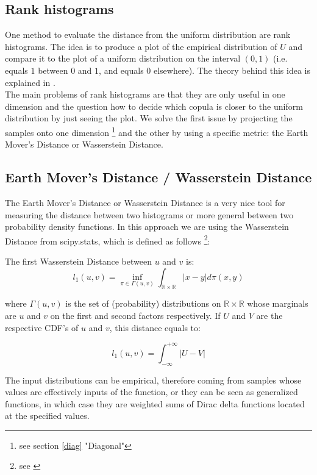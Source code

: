 \subsection{Rank histograms}\label{rank}

One method to evaluate the distance from the uniform distribution are rank histograms. The idea is to produce a plot of the empirical distribution of $U$ and compare it to the plot of a uniform distribution on the interval $(0,1)$ (i.e. equals $1$ between $0$ and $1$, and equals $0$ elsewhere). The theory behind this idea is explained in \cite{rank histo}.\\

The main problems of rank histograms are that they are only useful in one dimension and the question how to decide which copula is closer to the uniform distribution by just seeing the plot. We solve the first issue by projecting the samples onto one dimension \footnote{see section \ref{diag} "Diagonal"} and the other by using a specific metric: the Earth Mover's Distance or Wasserstein Distance.  

\subsection{Earth Mover's Distance / Wasserstein Distance}\label{emd}

The Earth Mover's Distance or Wasserstein Distance is a very nice tool for measuring the distance between two histograms or more general between two probability density functions. In this approach we are using the Wasserstein Distance from scipy.stats, which is defined as follows \footnote{see \cite{scipy}}:

\begin{definition}\label{WD}
	The first Wasserstein Distance between $u$ and $v$ is:
	\begin{equation*}
		l_{1}(u,v)=\inf_{\pi \in \Gamma(u,v)}\int_{\mathbb{R}\times\mathbb{R}}|x-y|d\pi(x,y)
	\end{equation*}
	
	where $\Gamma(u,v)$ is the set of (probability) distributions on $\mathbb{R}\times\mathbb{R}$ whose marginals are $u$ and $v$ on the first and second factors respectively.
	If $U$ and $V$ are the respective CDF's of $u$ and $v$, this distance equals to:
	
	\begin{equation*}
		l_{1}(u,v)=\int_{-\infty}^{+\infty}|U-V|
	\end{equation*}
	
	The input distributions can be empirical, therefore coming from samples whose values are effectively inputs of the function, or they can be seen as generalized functions, in which case they are weighted sums of Dirac delta functions located at the specified values.
\end{definition}

